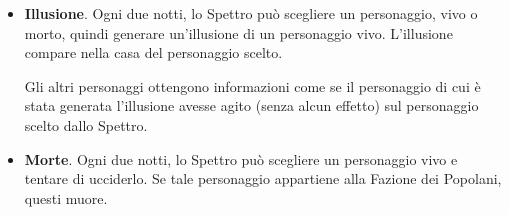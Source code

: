 \documentclass[a4paper,10pt]{article}
\begin{document}
\begin{itemize}

 \item {\bf Illusione}. Ogni due notti, lo Spettro può scegliere un personaggio, vivo o morto, quindi generare un'illusione di un personaggio vivo. L'illusione compare nella casa del personaggio scelto.
 
 Gli altri personaggi ottengono informazioni come se il personaggio di cui è stata generata l'illusione avesse agito (senza alcun effetto) sul personaggio scelto dallo Spettro.
 
 

 
 \item {\bf Morte}. Ogni due notti, lo Spettro può scegliere un personaggio vivo e tentare di ucciderlo. Se tale personaggio appartiene alla Fazione dei Popolani, questi muore. 
 

\end{itemize}
\end{document}
